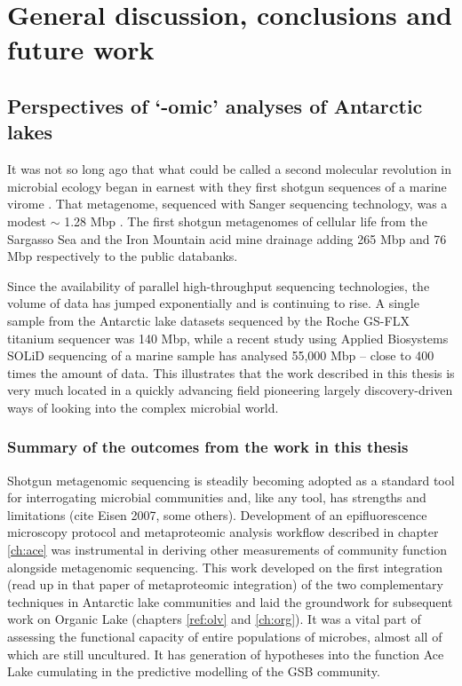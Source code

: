 \chapter{General discussion, conclusions and future work}
\label{ch:conc}
\acresetall

\section{Perspectives of `-omic' analyses of Antarctic lakes}
It was not so long ago that what could be called a second molecular revolution in microbial ecology began in earnest with they first shotgun sequences of a marine virome \cite{Breitbart2002}.
That metagenome, sequenced with Sanger sequencing technology, was a modest $\sim$ 1.28 Mbp \cite{Breitbart2002}.
The first shotgun metagenomes of cellular life from the Sargasso Sea \cite{Venter2004} and the Iron Mountain acid mine drainage \cite{Tyson2004} adding 265 Mbp and 76 Mbp respectively to the public databanks.

Since the availability of parallel high-throughput sequencing technologies, the volume of data has jumped exponentially and is continuing to rise.
A single sample from the Antarctic lake datasets sequenced by the Roche GS-FLX titanium sequencer was 140 Mbp, while a recent study using Applied Biosystems SOLiD sequencing of a marine sample \cite{Iverson2012} has analysed 55,000 Mbp -- close to 400 times the amount of data.
This illustrates that the work described in this thesis is very much located in a quickly advancing field pioneering largely discovery-driven ways of looking into the complex microbial world.
 
\subsection{Summary of the outcomes from the work in this thesis}
Shotgun metagenomic sequencing is steadily becoming adopted as a standard tool for interrogating microbial communities and, like any tool, has strengths and limitations (cite Eisen 2007, some others).
Development of an epifluorescence microscopy protocol and metaproteomic analysis workflow described in chapter \ref{ch:ace} was instrumental in deriving other measurements of community function alongside metagenomic sequencing.
This work developed on the first integration (read up in that paper of metaproteomic integration) of the two complementary techniques in Antarctic lake communities and laid the groundwork for subsequent work on Organic Lake (chapters \ref{ref:olv} and \ref{ch:org}).
It was a vital part of assessing the functional capacity of entire populations of microbes, almost all of which are still uncultured.
It has generation of hypotheses into the function Ace Lake cumulating in the predictive modelling of the \ac{GSB} community.

